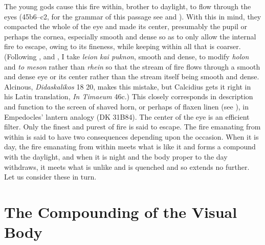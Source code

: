 The young gods cause this fire within, brother to daylight, to flow through the eyes (45b6--c2, for the grammar of this passage see \citealt[63 123--127]{Cook-Wilson:1889cs} and \citealt[277]{Taylor:1928qb}). With this in mind, they compacted the whole of the eye and made its center, presumably the pupil or perhaps the cornea, especially smooth and dense so as to only allow the internal fire to escape, owing to its fineness, while keeping within all that is coarser. (Following \citealt[125--6]{Cook-Wilson:1889cs}, \citealt[277]{Taylor:1928qb} and \citealt[152]{Cornford:1935fk}, I take \emph{leion kai puknon}, smooth and dense, to modify \emph{holon} and \emph{to meson} rather than \emph{rhein} so that the stream of fire flows through a smooth and dense eye or its center rather than the stream itself being smooth and dense. Alcinous, \emph{Didaskalikos} 18 20, makes this mistake, but Calcidius gets it right in his Latin translation, \emph{In Timaeum} 46c.) This closely corresponds in description and function to the screen of shaved horn, or perhaps of flaxen linen (see \citealt[240--1]{Wright:1981zr}), in Empedocles' lantern analogy (DK 31B84). The center of the eye is an efficient filter. Only the finest and purest of fire is said to escape. The fire emanating from within is said to have two consequences depending upon the occasion. When it is day, the fire emanating from within meets what is like it and forms a compound with the daylight, and when it is night and the body proper to the day withdraws, it meets what is unlike and is quenched and so extends no further. Let us consider these in turn.


\section{The Compounding of the Visual Body} %
\label{sec:the_compounding_of_the_visual_body}

